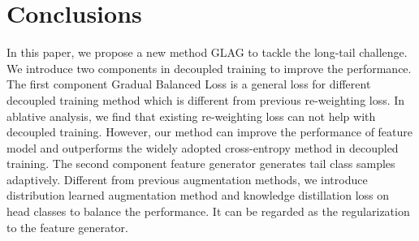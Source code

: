 \documentclass[runningheads]{llncs}
\begin{document}
\vspace{-10mm}
\section{Conclusions}

In this paper, we propose a new method GLAG to tackle the long-tail challenge. We introduce two components in decoupled training to improve the performance. The first component Gradual Balanced Loss is a general loss for different decoupled training method which is different from previous re-weighting loss. In ablative analysis, we find that existing re-weighting loss can not help with decoupled training. However, our method can improve the performance of feature model and outperforms the widely adopted cross-entropy method in decoupled training. The second component feature generator generates tail class samples adaptively. Different from previous augmentation methods, we introduce distribution learned augmentation method and knowledge distillation loss on head classes to balance the performance. It can be regarded as the regularization to the feature generator.








\clearpage


\end{document}
